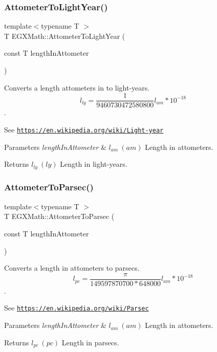 \subsubsection{\texorpdfstring{Attometer\+To\+Light\+Year()}{AttometerToLightYear()}}
{\footnotesize\ttfamily template$<$typename T $>$ \\
T E\+G\+X\+Math\+::\+Attometer\+To\+Light\+Year (\begin{DoxyParamCaption}\item[{const T}]{length\+In\+Attometer }\end{DoxyParamCaption})}



Converts a length attometers in to light-\/years. \[ l_{ly}= \frac{1}{9460730472580800} l_{am} * 10^{-18} \]. 

See \href{https://en.wikipedia.org/wiki/Light-year}{\tt https\+://en.\+wikipedia.\+org/wiki/\+Light-\/year} 
\begin{DoxyParams}{Parameters}
{\em length\+In\+Attometer} & $ l_{am}\ (am)$ Length in attometers. \\
\hline
\end{DoxyParams}
\begin{DoxyReturn}{Returns}
$ l_{ly}\ (ly)$ Length in light-\/years. 
\end{DoxyReturn}
\mbox{\label{group___e_g_x_math-_conversions-_length_conversions-_s_i-_attometer-_astronomical_ga2f4a0e26e97c60a8f37a1f813d158f48}} 
\subsubsection{\texorpdfstring{Attometer\+To\+Parsec()}{AttometerToParsec()}}
{\footnotesize\ttfamily template$<$typename T $>$ \\
T E\+G\+X\+Math\+::\+Attometer\+To\+Parsec (\begin{DoxyParamCaption}\item[{const T}]{length\+In\+Attometer }\end{DoxyParamCaption})}



Converts a length in attometers to parsecs. \[ l_{pc}=\frac{\pi}{149597870700 * 648000} l_{am} * 10^{-18} \]. 

See \href{https://en.wikipedia.org/wiki/Parsec}{\tt https\+://en.\+wikipedia.\+org/wiki/\+Parsec} 
\begin{DoxyParams}{Parameters}
{\em length\+In\+Attometer} & $ l_{am}\ (am)$ Length in attometers. \\
\hline
\end{DoxyParams}
\begin{DoxyReturn}{Returns}
$ l_{pc}\ (pc)$ Length in parsecs. 
\end{DoxyReturn}
